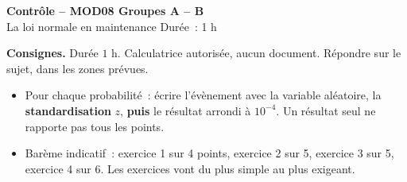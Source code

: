 \documentclass[a4paper,11pt]{article}
\newcommand{\GRP}{A -- B}
\begin{document}
\begin{tcolorbox}[colback=uimmred, colframe=uimmred, sharp corners, boxrule=0pt,
  left=14pt, right=14pt, top=8pt, bottom=8pt]
{\color{white}\LARGE\bfseries Contrôle -- MOD08 \hfill Groupes \GRP}\\[3pt]
{\color{white}\large La loi normale en maintenance \hfill Durée~: 1 h}
\end{tcolorbox}

\vspace{2pt}

\begin{consigne}\small
\textbf{Consignes.} Durée $1$ h. Calculatrice autorisée, aucun document. Répondre sur le sujet, dans les zones prévues.
\begin{itemize}[leftmargin=12pt, itemsep=0pt, topsep=2pt]
  \item Pour chaque probabilité~: écrire l'évènement avec la variable aléatoire, la \textbf{standardisation} $z$, \textbf{puis} le résultat arrondi à $10^{-4}$. Un résultat seul ne rapporte pas tous les points.
  \item Barème indicatif~: exercice 1 sur 4 points, exercice 2 sur 5, exercice 3 sur 5, exercice 4 sur 6. Les exercices vont du plus simple au plus exigeant.
\end{itemize}
\end{consigne}
\end{document}
